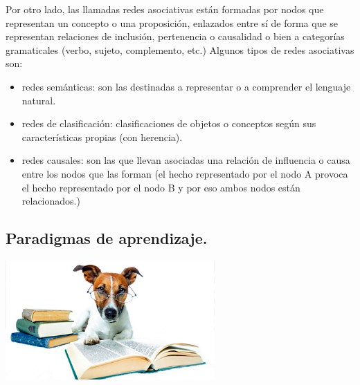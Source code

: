 \documentclass[a4paper, 11pt]{article}
\begin{document}
Por otro lado, las llamadas redes asociativas están formadas por nodos que representan un concepto o una proposición, enlazados entre sí de forma que se representan relaciones de inclusión, pertenencia o causalidad o bien a categorías gramaticales (verbo, sujeto, complemento, etc.) Algunos tipos de redes asociativas son:
\begin{itemize}
	\item redes semánticas: son las destinadas a representar o a comprender el lenguaje natural.
	\item redes de clasificación: clasificaciones de objetos o conceptos según sus características propias (con herencia).
	\item redes causales: son las que llevan asociadas una relación de influencia o causa entre los nodos que las forman (el hecho representado por el nodo A provoca el hecho representado por el nodo B y por eso ambos nodos están relacionados.)
\end{itemize}


\subsection{Paradigmas de aprendizaje.}
\includegraphics[width=0.60\textwidth]{perro.jpg} 
\end{document}
